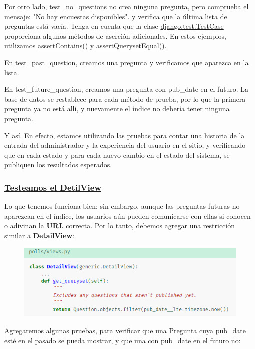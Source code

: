 \documentclass[10pt]{article}
\begin{document}
Por otro lado, \textcolor{G}{test\_no\_questions} no crea ninguna pregunta, pero comprueba el mensaje: "No hay encuestas disponibles". y verifica que la última lista de preguntas está vacía. Tenga en cuenta que la clase {\href{https://docs.djangoproject.com/en/3.0/topics/testing/tools/\#django.test.TestCase}{\textcolor{B}{django.test.TestCase}}} proporciona algunos métodos de aserción adicionales. En estos ejemplos, utilizamos {\href{https://docs.djangoproject.com/en/3.0/topics/testing/tools/\#django.test.SimpleTestCase.assertContains}{\textcolor{B}{assertContains()}}} y {\href{https://docs.djangoproject.com/en/3.0/topics/testing/tools/\#django.test.TransactionTestCase.assertQuerysetEqual}{\textcolor{B}{assertQuerysetEqual()}}}.

En \textcolor{G}{test\_past\_question}, creamos una pregunta y verificamos que aparezca en la lista.

En \textcolor{G}{test\_future\_question}, creamos una pregunta con \textcolor{G}{pub\_date} en el futuro. La base de datos se restablece para cada método de prueba, por lo que la primera pregunta ya no está allí, y nuevamente el índice no debería tener ninguna pregunta.

Y así. En efecto, estamos utilizando las pruebas para contar una historia de la entrada del administrador y la experiencia del usuario en el sitio, y verificando que en cada estado y para cada nuevo cambio en el estado del sistema, se publiquen los resultados esperados.

\subsubsection*{\underline{Testeamos el DetilView}}
Lo que tenemos funciona bien; sin embargo, aunque las preguntas futuras no aparezcan en el índice, los usuarios aún pueden comunicarse con ellas si conocen o adivinan la \textbf{URL} correcta. Por lo tanto, debemos agregar una restricción similar a \textbf{DetailView}:
\begin{figure}[H]
\begin{center}
\includegraphics[scale=1]{figuras/3/35/357/img9.png}
\end{center}
\end{figure}
Agregaremos algunas pruebas, para verificar que una Pregunta cuya \textcolor{G}{pub\_date} esté en el pasado se pueda mostrar, y que una con \textcolor{G}{pub\_date} en el futuro no:
\end{document}
